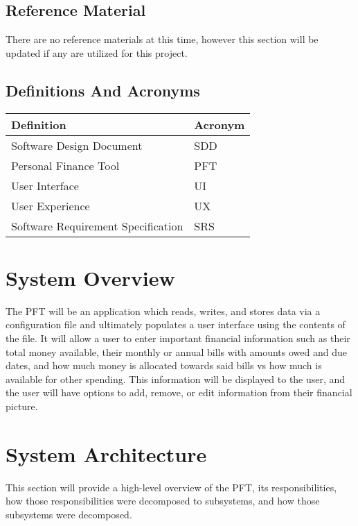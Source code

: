 \documentclass{article}
\begin{document}
\subsection{Reference Material}

There are no reference materials at this time, however this section will be updated if any are utilized for this project.

\subsection{Definitions And Acronyms}

\begin{longtable}{| p{6cm} | p{2cm} |}
    \hline
    \textbf{Definition} & \textbf{Acronym} \\
    \hline
    Software Design Document & SDD \\
    \hline
    Personal Finance Tool & PFT \\
    \hline
    User Interface & UI \\
    \hline
    User Experience & UX \\
    \hline
    Software Requirement Specification & SRS \\
    \hline
\end{longtable}

\section{System Overview}

The PFT will be an application which reads, writes, and stores data via a configuration file and ultimately populates a user interface using the contents of the file. It will allow a user to enter 
important financial information such as their total money available, their monthly or annual bills with amounts owed and due dates, and how much money is allocated towards said bills vs how much is available for other spending. This information will be displayed to the user,
and the user will have options to add, remove, or edit information from their financial picture. 

\section{System Architecture}

This section will provide a high-level overview of the PFT, its responsibilities, how those responsibilities were decomposed to subsystems, and how those subsystems were decomposed.
\end{document}

